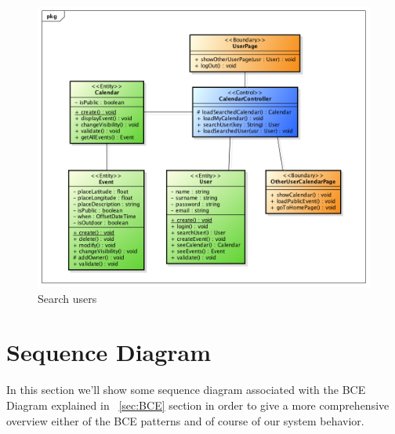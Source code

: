 \begin{center}
 \begin{figure}[H]
    \includegraphics[width=1\textwidth]{../BCEDiagram/BCE/EntityOverview/SearchUserBCE.png}
    \caption{Search users}
     \label{fig:searchBCE}
     \end{figure}
   \end{center}  
\section{Sequence Diagram}
In this section we'll show some sequence diagram associated with the BCE Diagram explained in ~\ref{sec:BCE} section in order to give  a more comprehensive overview either of the BCE patterns and of course of our system behavior.
